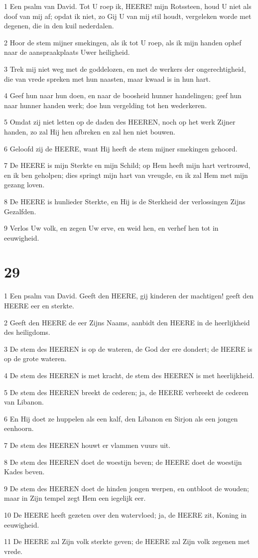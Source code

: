 \par 1 Een psalm van David. Tot U roep ik, HEERE! mijn Rotssteen, houd U niet als doof van mij af; opdat ik niet, zo Gij U van mij stil houdt, vergeleken worde met degenen, die in den kuil nederdalen.
\par 2 Hoor de stem mijner smekingen, als ik tot U roep, als ik mijn handen ophef naar de aanspraakplaats Uwer heiligheid.
\par 3 Trek mij niet weg met de goddelozen, en met de werkers der ongerechtigheid, die van vrede spreken met hun naasten, maar kwaad is in hun hart.
\par 4 Geef hun naar hun doen, en naar de boosheid hunner handelingen; geef hun naar hunner handen werk; doe hun vergelding tot hen wederkeren.
\par 5 Omdat zij niet letten op de daden des HEEREN, noch op het werk Zijner handen, zo zal Hij hen afbreken en zal hen niet bouwen.
\par 6 Geloofd zij de HEERE, want Hij heeft de stem mijner smekingen gehoord.
\par 7 De HEERE is mijn Sterkte en mijn Schild; op Hem heeft mijn hart vertrouwd, en ik ben geholpen; dies springt mijn hart van vreugde, en ik zal Hem met mijn gezang loven.
\par 8 De HEERE is hunlieder Sterkte, en Hij is de Sterkheid der verlossingen Zijns Gezalfden.
\par 9 Verlos Uw volk, en zegen Uw erve, en weid hen, en verhef hen tot in eeuwigheid.

\chapter{29}

\par 1 Een psalm van David. Geeft den HEERE, gij kinderen der machtigen! geeft den HEERE eer en sterkte.
\par 2 Geeft den HEERE de eer Zijns Naams, aanbidt den HEERE in de heerlijkheid des heiligdoms.
\par 3 De stem des HEEREN is op de wateren, de God der ere dondert; de HEERE is op de grote wateren.
\par 4 De stem des HEEREN is met kracht, de stem des HEEREN is met heerlijkheid.
\par 5 De stem des HEEREN breekt de cederen; ja, de HEERE verbreekt de cederen van Libanon.
\par 6 En Hij doet ze huppelen als een kalf, den Libanon en Sirjon als een jongen eenhoorn.
\par 7 De stem des HEEREN houwt er vlammen vuurs uit.
\par 8 De stem des HEEREN doet de woestijn beven; de HEERE doet de woestijn Kades beven.
\par 9 De stem des HEEREN doet de hinden jongen werpen, en ontbloot de wouden; maar in Zijn tempel zegt Hem een iegelijk eer.
\par 10 De HEERE heeft gezeten over den watervloed; ja, de HEERE zit, Koning in eeuwigheid.
\par 11 De HEERE zal Zijn volk sterkte geven; de HEERE zal Zijn volk zegenen met vrede.

